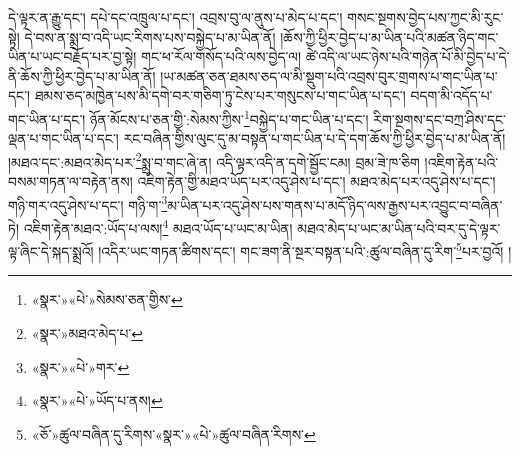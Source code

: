 དེ་ལྟར་ན་རྒྱུ་དང་། དཔེ་དང་འཁྲུལ་པ་དང་། འབྲས་བུ་ལ་ནུས་པ་མེད་པ་དང་། གསང་སྔགས་བྱེད་པས་ཀྱང་མི་རུང་སྟེ། དེ་བས་ན་སྨྲ་བ་འདི་ཡང་རིགས་པས་བསྐྱེད་པ་མ་ཡིན་ནོ། །ཆོས་ཀྱི་ཕྱིར་བྱེད་པ་མ་ཡིན་པའི་མཚན་ཉིད་གང་ཡིན་པ་ཡང་བརྗོད་པར་བྱ་སྟེ། གང་ཕ་རོལ་གསོད་པའི་ལས་བྱེད་ལ། ཚེ་འདི་ལ་ཡང་ཉེས་པའི་གཉེན་པོ་མི་བྱེད་པ་དེ་ནི་ཆོས་ཀྱི་ཕྱིར་བྱེད་པ་མ་ཡིན་ནོ། །ཡ་མཚན་ཅན་ཐམས་ཅད་ལ་མི་སྡུག་པའི་འབྲས་བུར་གྲགས་པ་གང་ཡིན་པ་དང་། ཐམས་ཅད་མཁྱེན་པས་མི་དགེ་བར་གཅིག་ཏུ་ངེས་པར་གསུངས་པ་གང་ཡིན་པ་དང་། བདག་མི་འདོད་པ་གང་ཡིན་པ་དང་། ཉོན་མོངས་པ་ཅན་གྱི་:སེམས་ཀྱིས་\footnote{«སྣར་»«པེ་»སེམས་ཅན་གྱིས་}བསྐྱེད་པ་གང་ཡིན་པ་དང་། རིག་སྔགས་དང་བཀྲ་ཤིས་དང་ལྡན་པ་གང་ཡིན་པ་དང་། རང་བཞིན་གྱིས་ལུང་དུ་མ་བསྟན་པ་གང་ཡིན་པ་དེ་དག་ཆོས་ཀྱི་ཕྱིར་བྱེད་པ་མ་ཡིན་ནོ། །མཐའ་དང་:མཐའ་མེད་པར་\footnote{«སྣར་»མཐའ་མེད་པ་}སྨྲ་བ་གང་ཞེ་ན། འདི་ལྟར་འདི་ན་དགེ་སྦྱོང་ངམ། བྲམ་ཟེ་ཁ་ཅིག །འཇིག་རྟེན་པའི་བསམ་གཏན་ལ་བརྟེན་ནས། འཇིག་རྟེན་གྱི་མཐའ་ཡོད་པར་འདུ་ཤེས་པ་དང་། མཐའ་མེད་པར་འདུ་ཤེས་པ་དང་། གཉི་གར་འདུ་ཤེས་པ་དང་། གཉི་ག་\footnote{«སྣར་»«པེ་»གར་}མ་ཡིན་པར་འདུ་ཤེས་པས་གནས་པ་མདོ་ཉིད་ལས་རྒྱས་པར་འབྱུང་བ་བཞིན་ཏེ། འཇིག་རྟེན་མཐའ་:ཡོད་པ་ལས།\footnote{«སྣར་»«པེ་»ཡོད་པ་ནས།} མཐའ་ཡོད་པ་ཡང་མ་ཡིན། མཐའ་མེད་པ་ཡང་མ་ཡིན་པའི་བར་དུ་དེ་ལྟར་ལྟ་ཞིང་དེ་སྐད་སྨྲའོ། །འདིར་ཡང་གཏན་ཚིགས་དང་། གང་ཟག་ནི་སྔར་བསྟན་པའི་:ཚུལ་བཞིན་དུ་རིག་\footnote{«ཅོ་»ཚུལ་བཞིན་དུ་རིགས་«སྣར་»«པེ་»ཚུལ་བཞིན་རིགས་}པར་བྱའོ། །
